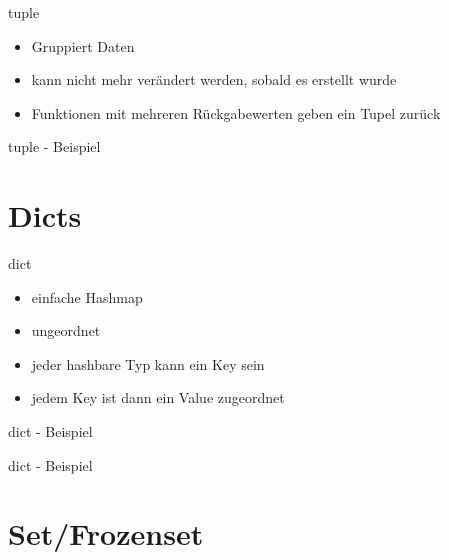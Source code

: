 \begin{frame}{tuple}
	\begin{itemize}
		\item Gruppiert Daten
		\item kann nicht mehr verändert werden, sobald es erstellt wurde
		\item Funktionen mit mehreren Rückgabewerten geben ein Tupel zurück
	\end{itemize}
\end{frame}

\begin{frame}{tuple - Beispiel}
	
\end{frame}


\section{Dicts}

\begin{frame}{dict}
	\begin{itemize}
		\item einfache Hashmap
		\item ungeordnet
		\item jeder hashbare Typ kann ein Key sein
		\item jedem Key ist dann ein Value zugeordnet
	\end{itemize}
\end{frame}

\begin{frame}{dict - Beispiel}
    
\end{frame}

\begin{frame}{dict - Beispiel}
    
\end{frame}


\section{Set/Frozenset}

